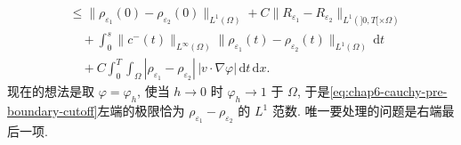 \begin{sloppypar}
\begin{Proof}
\begin{itemize}
\begin{equation}
\begin{aligned}
 &\leq\|\rho_{\varepsilon_1}(0)-\rho_{\varepsilon_2}(0)\|_{L^1(\Omega)}
 +C\|R_{\varepsilon_1}-R_{\varepsilon_2}\|_{L^1(]0,T[\times\Omega)}\\
 &\quad+\int_0^s\|c^-(t)\|_{L^\infty(\Omega)}
 \|\rho_{\varepsilon_1}(t)-\rho_{\varepsilon_2}(t)\|_{L^1(\Omega)}\,\mathrm dt\\
 &\quad+C\int_0^T\int_\Omega
 |\rho_{\varepsilon_1}-\rho_{\varepsilon_2}|\,|v\cdot\nabla\varphi|
 \,\mathrm dt\,\mathrm dx.
 \end{aligned}
 \label{eq:chap6-cauchy-pre-boundary-cutoff}
 \end{equation}
 现在的想法是取 $\varphi=\varphi_h$, 使当 $h\to0$ 时 $\varphi_h\to1$ 于 $\Omega$, 于是\eqref{eq:chap6-cauchy-pre-boundary-cutoff}左端的极限恰为 $\rho_{\varepsilon_1}-\rho_{\varepsilon_2}$ 的 $L^1$ 范数. 唯一要处理的问题是右端最后一项.


\end{itemize}
\end{Proof}
\end{sloppypar}
